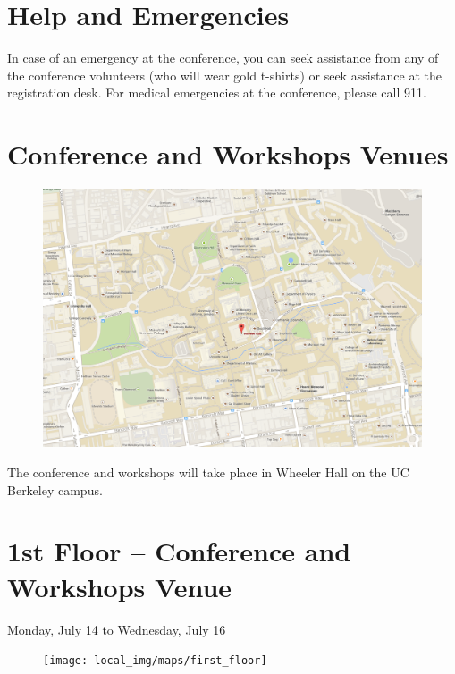 \vspace{3mm}
\section*{Help and Emergencies}
In case of an emergency at the conference, you can seek assistance from any of the conference volunteers (who will wear gold t-shirts) or seek assistance at the registration desk. For medical emergencies at the conference, please call 911.

\clearpage
{} \section{Conference and Workshops Venues}
\begin{figure}[h!]
\includegraphics[width=\linewidth]{local_img/maps/wheeler_hall}
\end{figure}
\vspace{0.3cm}
{\Large The conference and workshops will take place in Wheeler Hall on the UC Berkeley campus.}

\newpage
{} \section{1st Floor -- Conference and Workshops Venue}
{\large Monday, July 14 to Wednesday, July 16}
\begin{figure}[h!]
\center
\texttt{[image: local\_img/maps/first\_floor]}
\end{figure}

\vspace{0.3cm}

